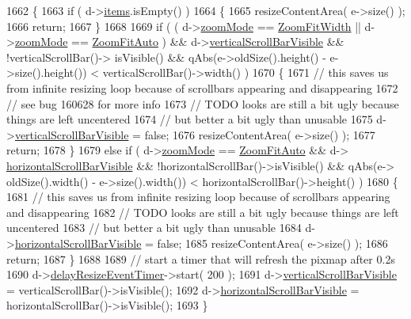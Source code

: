 \begin{DoxyCode}
1662 \{
1663     \textcolor{keywordflow}{if} ( d->\hyperlink{classPageViewPrivate_ad90c795dead9abfaa5818a94e00435bc}{items}.isEmpty() )
1664     \{
1665         resizeContentArea( e->size() );
1666         \textcolor{keywordflow}{return};
1667     \}
1668 
1669     \textcolor{keywordflow}{if} ( ( d->\hyperlink{classPageViewPrivate_a009f59f9f081ced030a81a8ca726c2b2}{zoomMode} == \hyperlink{classPageView_af489dc2492677bb4f422660627f62aeca37b37e7554b8276eabe7310a11263664}{ZoomFitWidth} || d->\hyperlink{classPageViewPrivate_a009f59f9f081ced030a81a8ca726c2b2}{zoomMode} == 
      \hyperlink{classPageView_af489dc2492677bb4f422660627f62aeca4021dc6ca422fa846e8c9c31e606cdbe}{ZoomFitAuto} ) && d->\hyperlink{classPageViewPrivate_ae6defa78192680c6f0943b1d2b2aafa8}{verticalScrollBarVisible} && !verticalScrollBar()->
      isVisible() && qAbs(e->oldSize().height() - e->size().height()) < verticalScrollBar()->width() )
1670     \{
1671         \textcolor{comment}{// this saves us from infinite resizing loop because of scrollbars appearing and disappearing}
1672         \textcolor{comment}{// see bug 160628 for more info}
1673         \textcolor{comment}{// TODO looks are still a bit ugly because things are left uncentered}
1674         \textcolor{comment}{// but better a bit ugly than unusable}
1675         d->\hyperlink{classPageViewPrivate_ae6defa78192680c6f0943b1d2b2aafa8}{verticalScrollBarVisible} = \textcolor{keyword}{false};
1676         resizeContentArea( e->size() );
1677         \textcolor{keywordflow}{return};
1678     \}
1679     \textcolor{keywordflow}{else} \textcolor{keywordflow}{if} ( d->\hyperlink{classPageViewPrivate_a009f59f9f081ced030a81a8ca726c2b2}{zoomMode} == \hyperlink{classPageView_af489dc2492677bb4f422660627f62aeca4021dc6ca422fa846e8c9c31e606cdbe}{ZoomFitAuto} && d->
      \hyperlink{classPageViewPrivate_accc11688dc248fe9a09713b1c1acbe5e}{horizontalScrollBarVisible} && !horizontalScrollBar()->isVisible() && qAbs(e->
      oldSize().width() - e->size().width()) < horizontalScrollBar()->height() )
1680     \{
1681         \textcolor{comment}{// this saves us from infinite resizing loop because of scrollbars appearing and disappearing}
1682         \textcolor{comment}{// TODO looks are still a bit ugly because things are left uncentered}
1683         \textcolor{comment}{// but better a bit ugly than unusable}
1684         d->\hyperlink{classPageViewPrivate_accc11688dc248fe9a09713b1c1acbe5e}{horizontalScrollBarVisible} = \textcolor{keyword}{false};
1685         resizeContentArea( e->size() );
1686         \textcolor{keywordflow}{return};
1687     \}
1688 
1689     \textcolor{comment}{// start a timer that will refresh the pixmap after 0.2s}
1690     d->\hyperlink{classPageViewPrivate_a65c32086d23fd9e7fa3bd4256e7f2788}{delayResizeEventTimer}->start( 200 );
1691     d->\hyperlink{classPageViewPrivate_ae6defa78192680c6f0943b1d2b2aafa8}{verticalScrollBarVisible} = verticalScrollBar()->isVisible();
1692     d->\hyperlink{classPageViewPrivate_accc11688dc248fe9a09713b1c1acbe5e}{horizontalScrollBarVisible} = horizontalScrollBar()->isVisible();
1693 \}
\end{DoxyCode}
